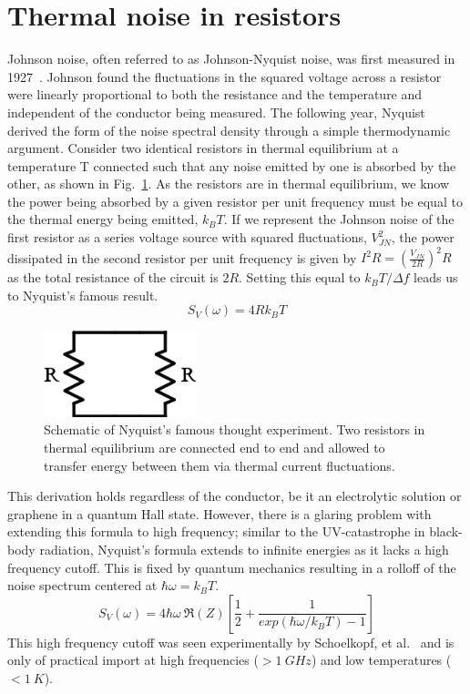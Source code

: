 \section{Thermal noise in resistors}
Johnson noise, often referred to as Johnson-Nyquist noise, was first measured in 1927~\cite{johnson_thermal_1927}. Johnson found the fluctuations in the squared voltage across a resistor were linearly proportional to both the resistance and the temperature and independent of the conductor being measured. The following year, Nyquist derived the form of the noise spectral density through a simple thermodynamic argument. Consider two identical resistors in thermal equilibrium at a temperature T connected such that any noise emitted by one is absorbed by the other, as shown in Fig.~\ref{fig:Nyquist_resistors}. As the resistors are in thermal equilibrium, we know the power being absorbed by a given resistor per unit frequency must be equal to the thermal energy being emitted, $k_BT$. If we represent the Johnson noise of the first resistor as a series voltage source with squared fluctuations, $V_{JN}^2$, the power dissipated in the second resistor per unit frequency is given by $I^2R = \left(\frac{V_{JN}}{2R}\right)^2R$ as the total resistance of the circuit is $2R$. Setting this equal to $k_BT / \Delta f$ leads us to Nyquist's famous result.
\begin{equation}\label{eq:Nyquist}
S_{V}(\omega) = 4Rk_BT
\end{equation}
\begin{figure}
\centering
\includegraphics[height = 25mm]{figures/Johnson_noise_thermometry/Nyquist_resistors.png}
\caption{Schematic of Nyquist's famous thought experiment. Two resistors in thermal equilibrium are connected end to end and allowed to transfer energy between them via thermal current fluctuations.}
\label{fig:Nyquist_resistors}
\end{figure}
This derivation holds regardless of the conductor, be it an electrolytic solution or graphene in a quantum Hall state. However, there is a glaring problem with extending this formula to high frequency; similar to the UV-catastrophe in black-body radiation, Nyquist's formula extends to infinite energies as it lacks a high frequency cutoff. This is fixed by quantum mechanics resulting in a rolloff of the noise spectrum centered at $\hbar\omega = k_BT$.
\begin{equation}\label{eq:NyquistFull}
S_V(\omega) = 4\hbar\omega~\Re(Z)\left[\frac{1}{2}+\frac{1}{exp(\hbar\omega/k_BT)-1}\right]
\end{equation}
This high frequency cutoff was seen experimentally by Schoelkopf, et al.~\cite{schoelkopf_frequency_1997} and is only of practical import at high frequencies ($>1~GHz$) and low temperatures ($<1~K$).

